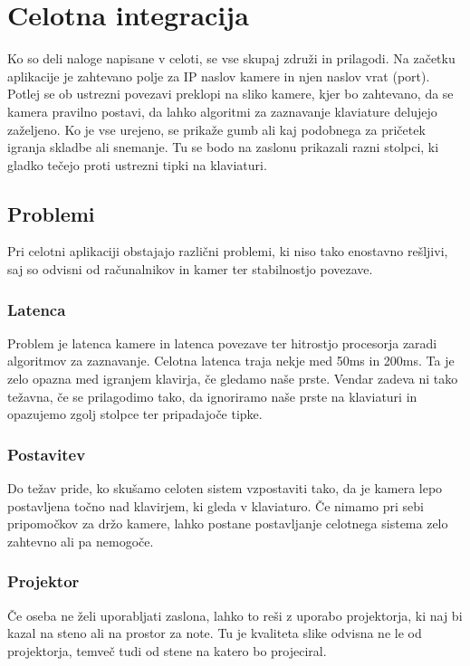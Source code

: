 \documentclass[a4paper,12pt,openright]{book}
\begin{document}
\chapter{Celotna integracija}
\label{ch2}

Ko so deli naloge napisane v celoti, se vse skupaj združi in prilagodi. Na začetku aplikacije je zahtevano polje za IP naslov kamere in njen naslov vrat (port). Potlej se ob ustrezni povezavi preklopi na sliko kamere, kjer bo zahtevano, da se kamera pravilno postavi, da lahko algoritmi za zaznavanje klaviature delujejo zaželjeno. 
Ko je vse urejeno, se prikaže gumb ali kaj podobnega za pričetek igranja skladbe ali snemanje. Tu se bodo na zaslonu prikazali razni stolpci, ki gladko tečejo proti ustrezni tipki na klaviaturi.



\section{Problemi}
Pri celotni aplikaciji obstajajo različni problemi, ki niso tako enostavno rešljivi, saj so odvisni od računalnikov in kamer ter stabilnostjo povezave.
\subsection{Latenca}
Problem je latenca kamere in latenca povezave ter hitrostjo procesorja zaradi algoritmov za zaznavanje. Celotna latenca traja nekje med 50ms in 200ms. Ta je zelo opazna med igranjem klavirja, če gledamo naše prste. Vendar zadeva ni tako težavna, če se prilagodimo tako, da ignoriramo naše prste na klaviaturi in opazujemo zgolj stolpce ter pripadajoče tipke.
\subsection{Postavitev}
Do težav pride, ko skušamo celoten sistem vzpostaviti tako, da je kamera lepo postavljena točno nad klavirjem, ki gleda v klaviaturo. Če nimamo pri sebi pripomočkov za držo kamere, lahko postane postavljanje celotnega sistema zelo zahtevno ali pa nemogoče. 
\subsection{Projektor}
Če oseba ne želi uporabljati zaslona, lahko to reši z uporabo projektorja, ki naj bi kazal na steno ali na prostor za note. Tu je kvaliteta slike odvisna ne le od projektorja, temveč tudi od stene na katero bo projeciral.
\end{document}
